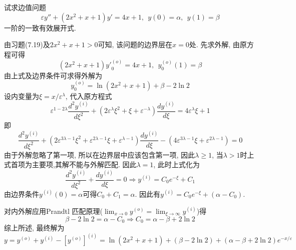 \begin{problem}[习题7.22]
试求边值问题
\[
\varepsilon y'' + (2x^2+x+1)y' = 4x+ 1, ~~
y(0)= \alpha, ~~ y(1) = \beta
\]
一阶的一致有效展开式.
\end{problem}

\begin{solution}
由习题(7.19)及$2x^{2}+x+1>0$可知, 该问题的边界层在$x=0$处. 先求外解, 由原方程可得
\[
(2x^{2}+x+1) {y'}_{0}^{(o)}=4x+1,~~y_{0}^{(o)}(1)=\beta
\]
由上式及边界条件可求得外解为
\[
y_{0}^{(o)}=\ln(2x^{2}+x+1)+\beta-2\ln2
\]
设内变量为$\xi=x/\varepsilon^{\lambda}$, 代入原方程式
\[
\varepsilon^{1-2\lambda}\frac{d^{2}y^{(i)}}{d\xi^{2}}+(2\varepsilon^{\lambda}\xi^{2}+\xi+\varepsilon^{-\lambda})\frac{dy^{(i)}}{d\xi}=4\varepsilon^{\lambda}\xi+1
\]
即
\[
\frac{d^{2}y^{(i)}}{d\xi^{2}}+(2\varepsilon^{3\lambda-1}\xi^{2}+\varepsilon^{2\lambda-1}\xi+\varepsilon^{\lambda-1})\frac{dy^{(i)}}{d\xi}-(4\varepsilon^{3\lambda-1}\xi+\varepsilon^{2\lambda-1})=0
\]
由于外解忽略了第一项, 所以在边界层中应该包含第一项, 因此$\lambda\geq1$, 当$\lambda>1$时上式首项为主要项,其解不能与外解匹配.
因此$\lambda=1$, 此时上式化为
\[
\frac{d^{2}y^{(i)}}{d\xi^{2}}+\frac{dy^{(i)}}{d\xi}=0\Rightarrow y^{(i)}=C_{0}e^{-\xi}+C_{1}
\]
由边界条件$y^{(i)}(0)=\alpha$可得$C_{0}+C_{1}=\alpha$. 因此有$y^{(i)}=C_{0}e^{-\xi}+(\alpha-C_{0})$.

\vspace{1em}

\noindent 对内外解应用Prandtl 匹配原理($\lim_{x\rightarrow0}y^{(o)}=\lim_{\xi\rightarrow\infty}y^{(i)}$)得
\[
\beta-2\ln2=\alpha-C_{0}\Rightarrow C_{0}=\alpha-\beta+2\ln2
\]
综上所述, 最终解为
\[
y=y^{(o)}+y^{(i)}-[y^{(o)}]^{(i)}=\ln(2x^{2}+x+1)+(\beta-2\ln2)+(\alpha-\beta+2\ln2)e^{-x/\varepsilon}
\]
\end{solution} 
